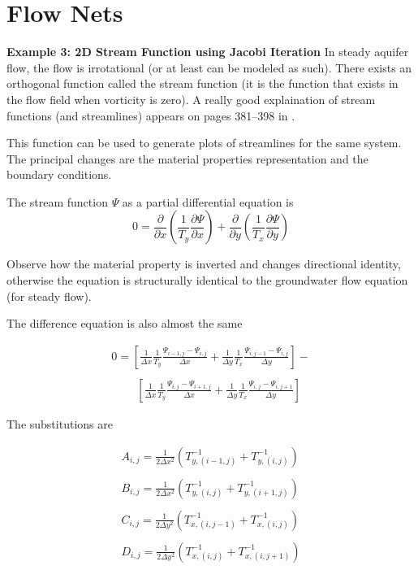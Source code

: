 \section{Flow Nets}
\textbf{Example 3: 2D Stream Function using Jacobi Iteration}
In steady aquifer flow, the flow is irrotational (or at least can be modeled as such). 
There exists an orthogonal function called the stream function (it is the function that exists in the flow field when vorticity is zero).
A really good explaination of stream functions (and streamlines) appears on pages 381--398 in \cite{Zheng1995}.

This function can be used to generate plots of streamlines for the same system.
The principal changes are the material properties representation and the boundary conditions.  

The stream function $\Psi$ as a partial differential equation is
\begin{equation}
0= 
\frac{\partial}{\partial x}({\frac{1}{T_y} \frac{\partial \Psi}{\partial x}})
+
\frac{\partial}{\partial y}({\frac{1}{T_x} \frac{\partial \Psi}{\partial y}})
\end{equation}

Observe how the material property is inverted and changes directional identity, otherwise the equation is structurally identical to the groundwater flow equation (for steady flow).

The difference equation is also almost the same

\begin{equation}
\begin{matrix}
0= 
[\frac{1}{\Delta x} \frac{1}{T_{y}} \frac{\Psi_{i-1,j} - \Psi_{i,j}}{\Delta x} +
 \frac{1}{\Delta y} \frac{1}{T_{x}} \frac{\Psi_{i,j-1} - \Psi_{i,j}}{\Delta y}] - \\
~~~~~~~~~~\\
~~~~~~~~~~[ \frac{1}{\Delta x} \frac{1}{T_{y}}  \frac{\Psi_{i,j} - \Psi_{i+1,j}}{\Delta x} +
  \frac{1}{\Delta y}  \frac{1}{T_{x}} \frac{\Psi_{i,j} - \Psi_{i,j+1}}{\Delta y} ]        
\end{matrix}        
\end{equation}

The substitutions are

\begin{equation}
\begin{matrix}
A_{i,j} = \frac{1}{2 \Delta x^2}(T_{y,(i-1,j)}^{-1}+T_{y,(i,j)}^{-1}) \\ ~~ \\
B_{i,j} = \frac{1}{2 \Delta x^2}(T_{y,(i,j)}^{-1}+T_{y,(i+1,j)}^{-1})   \\ ~~ \\
C_{i,j} = \frac{1}{2 \Delta y^2}(T_{x,(i,j-1)}^{-1}+T_{x,(i,j)}^{-1})   \\ ~~ \\
D_{i,j} = \frac{1}{2 \Delta y^2}(T_{x,(i,j)}^{-1}+T_{x,(i,j+1)}^{-1})   \\ ~~ \\
\end{matrix}
\end{equation}

